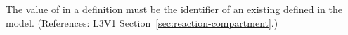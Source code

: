 The value of  in a \Reaction definition must be the
identifier of an existing \Compartment defined in the model.  (References:
L3V1 Section~\ref{sec:reaction-compartment}.)